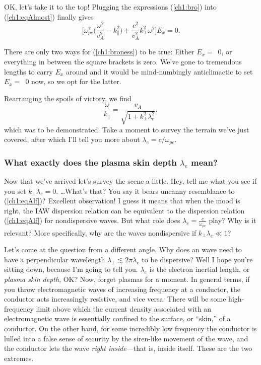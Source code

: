 OK, let's take it to the top! Plugging the expressions (\ref{ch1:bro}) into
(\ref{ch1:eqAlmost}) finally gives
\begin{equation} \label{ch1:broness}
  \Big [ \omega_{pe}^2 \Big ( \dfrac{\omega^2}{v_A^2} - k_\parallel^2 \Big ) + \dfrac{c^2}{v_A^2} k_\perp^2 \omega^2 \Big ] E_x = 0.
\end{equation}

There are only two ways for (\ref{ch1:broness}) to be true: Either $E_x =$~0, or
everything in between the square brackets is zero. We've gone to tremendous
lengths to carry $E_x$ around and it would be mind-numbingly anticlimactic to
set $E_x =$~0 now, so we opt for the latter. 

Rearranging the spoils of victory, we find
\begin{equation}
  \dfrac{\omega}{k_\parallel} = \dfrac{v_A}{ \sqrt{1 + k_\perp^2 \lambda_e^2 }},
\end{equation}
which was to be demonstrated. Take a moment to survey the terrain we've just
covered, after which I'll tell you more about $\lambda_e = c / \omega_{pe}$.

\subsubsection{What exactly does the plasma skin depth $\lambda_e$ mean?} 

Now that we've arrived let's survey the scene a little. Hey, tell me what you
see if you set $k_\perp \lambda_e = 0$. \dots What's that? You say it bears
uncanny resemblance to (\ref{ch1:eqAlf})? Excellent observation! I guess it
means that when the mood is right, the IAW dispersion relation can be
equivalent to the dispersion relation (\ref{ch1:eqAlf}) for nondispersive \Alf
waves. But what role does $\lambda_e = \frac{c}{\omega_{pe}}$ play?  Why is it
relevant? More specifically, why are the waves nondispersive if $k_\perp
\lambda_e \ll 1$?

Let's come at the question from a different angle. Why does an \Alf wave need to
have a perpendicular wavelength $\lambda_\perp \lesssim 2 \pi \lambda_e$ to be
dispersive? Well I hope you're sitting down, because I'm going to tell
you. $\lambda_e$ is the electron inertial length, or \emph{plasma skin depth},
OK? Now, forget plasmas for a moment. In general terms, if you throw
electromagnetic waves of increasing frequency at a conductor, the conductor acts
increasingly resistive, and vice versa. There will be some high-frequency limit
above which the current density associated with an electromagnetic wave is
essentially confined to the surface, or ``skin,'' of a conductor. On the other
hand, for some incredibly low frequency the conductor is lulled into a false
sense of security by the siren-like movement of the wave, and the conductor lets
the wave \emph{right inside}---that is, inside itself. These are the two
extremes.

